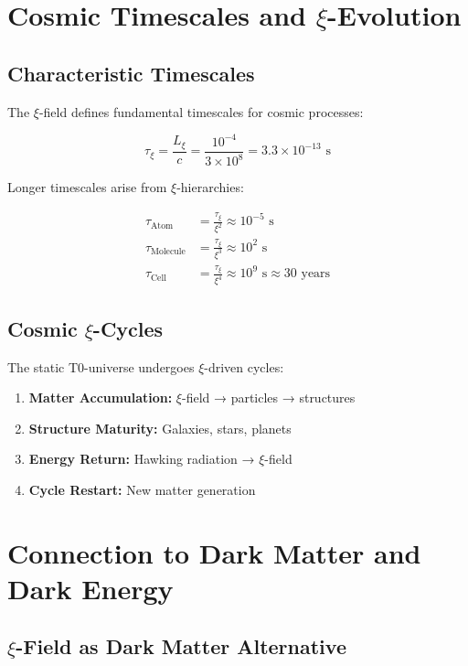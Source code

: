 \documentclass[12pt,a4paper]{article}
\newcommand{\xipar}{\xi}
\newcommand{\Lxi}{L_\xi}
\begin{document}
	\section{Cosmic Timescales and $\xi$-Evolution}
	
	\subsection{Characteristic Timescales}
	
	The $\xi$-field defines fundamental timescales for cosmic processes:
	
	\begin{equation}
		\tau_\xi = \frac{\Lxi}{c} = \frac{10^{-4}}{3 \times 10^8} = 3.3 \times 10^{-13} \text{ s}
	\end{equation}
	
	Longer timescales arise from $\xi$-hierarchies:
	
	\begin{align}
		\tau_{\text{Atom}} &= \frac{\tau_\xi}{\xipar^2} \approx 10^{-5} \text{ s} \\
		\tau_{\text{Molecule}} &= \frac{\tau_\xi}{\xipar^3} \approx 10^2 \text{ s} \\
		\tau_{\text{Cell}} &= \frac{\tau_\xi}{\xipar^4} \approx 10^9 \text{ s} \approx 30 \text{ years}
	\end{align}
	
	\subsection{Cosmic $\xi$-Cycles}
	
	The static T0-universe undergoes $\xi$-driven cycles:
	
	\begin{enumerate}
		\item \textbf{Matter Accumulation:} $\xi$-field → particles → structures
		\item \textbf{Structure Maturity:} Galaxies, stars, planets
		\item \textbf{Energy Return:} Hawking radiation → $\xi$-field
		\item \textbf{Cycle Restart:} New matter generation
	\end{enumerate}
	
	\section{Connection to Dark Matter and Dark Energy}
	
	\subsection{$\xi$-Field as Dark Matter Alternative}
	
\end{document}
